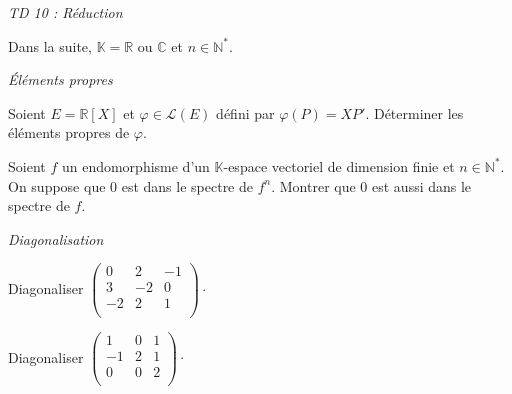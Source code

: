\documentclass[a4paper,10pt]{report}
\begin{document}
\everymath{\displaystyle}
\begin{center}
\textit{{ {\huge TD 10 : Réduction}}}
\end{center}

\bigskip


\noindent Dans la suite, $\mathbb{K} = \mathbb{R}$ ou $\mathbb{C}$ et $n \in \mathbb{N}^*$.

\medskip

\begin{center}
\textit{{ {\large Éléments propres}}}
\end{center}

\medskip

\begin{Exa}[\ding{80}] Soient $E = \mathbb{R}[X]$ et $\varphi \in \mathcal{L}(E)$ défini par $\varphi(P)=XP'$. Déterminer les éléments propres de $\varphi$.
\end{Exa}



\begin{Exa} Soient $f$ un endomorphisme d'un $\mathbb{K}$-espace vectoriel de dimension finie et $n \in \mathbb{N}^{*}$. On suppose que $0$ est dans le spectre de $f^n$. Montrer que $0$ est aussi dans le spectre de $f$.
\end{Exa}


\medskip

\begin{center}
\textit{{ {\large Diagonalisation}}}
\end{center}

\medskip

\begin{Exa} Diagonaliser $\begin{pmatrix}
0 & 2 & -1 \\
3 & -2 & 0 \\
-2 & 2 & 1 \\
\end{pmatrix}\cdot$
\end{Exa}



\begin{Exa} Diagonaliser $\begin{pmatrix}
1 & 0& 1 \\
-1 & 2 & 1 \\
0 & 0 & 2 \\
\end{pmatrix}\cdot$
\end{Exa}
\end{document}
